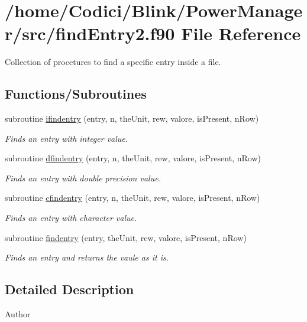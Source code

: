 \hypertarget{find_entry2_8f90}{\section{/home/\-Codici/\-Blink/\-Power\-Manager/src/find\-Entry2.f90 File Reference}
\label{find_entry2_8f90}
}


Collection of procetures to find a specific entry inside a file.  


\subsection*{Functions/\-Subroutines}
\begin{DoxyCompactItemize}
\item 
subroutine \hyperlink{find_entry2_8f90_a708156401460d527e8e70817b460bf8d}{ifindentry} (entry, n, the\-Unit, rew, valore, is\-Present, n\-Row)
\begin{DoxyCompactList}\small\item\em Finds an entry with integer value. \end{DoxyCompactList}\item 
subroutine \hyperlink{find_entry2_8f90_ab66eb6763b6ded668652e5783b3a5e80}{dfindentry} (entry, n, the\-Unit, rew, valore, is\-Present, n\-Row)
\begin{DoxyCompactList}\small\item\em Finds an entry with double precision value. \end{DoxyCompactList}\item 
subroutine \hyperlink{find_entry2_8f90_a82fb26aa686ac91d56422f8405ba79fb}{cfindentry} (entry, n, the\-Unit, rew, valore, is\-Present, n\-Row)
\begin{DoxyCompactList}\small\item\em Finds an entry with character value. \end{DoxyCompactList}\item 
subroutine \hyperlink{find_entry2_8f90_a5588807ee16232625f0911c02c0a7af9}{findentry} (entry, the\-Unit, rew, valore, is\-Present, n\-Row)
\begin{DoxyCompactList}\small\item\em Finds an entry and returns the vaule as it is. \end{DoxyCompactList}\end{DoxyCompactItemize}


\subsection{Detailed Description}
\begin{DoxyAuthor}{Author}

\end{DoxyAuthor}


